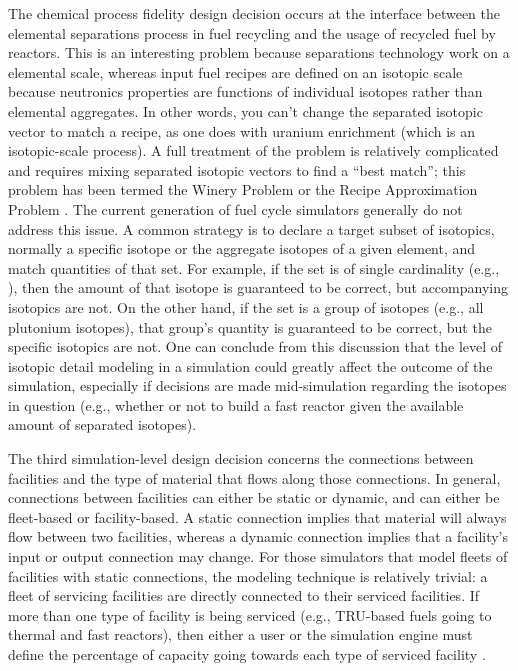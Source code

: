 The chemical process fidelity design decision occurs at the interface between
the elemental separations process in fuel recycling and the usage of recycled
fuel by reactors. This is an interesting problem because separations technology
work on a elemental scale, whereas input fuel recipes are defined on an isotopic
scale because neutronics properties are functions of individual isotopes rather
than elemental aggregates. In other words, you can't change the separated
isotopic vector to match a recipe, as one does with uranium enrichment (which is
an isotopic-scale process). A full treatment of the problem is relatively
complicated and requires mixing separated isotopic vectors to find a ``best
match''; this problem has been termed the Winery Problem or the Recipe
Approximation Problem \cite{oliver_geniusv2:_2009}. The current generation of
fuel cycle simulators generally do not address this issue. A common strategy is
to declare a target subset of isotopics, normally a specific isotope or the
aggregate isotopes of a given element, and match quantities of that set. For
example, if the set is of single cardinality (e.g., ), then the
amount of that isotope is guaranteed to be correct, but accompanying isotopics
are not. On the other hand, if the set is a group of isotopes (e.g., all
plutonium isotopes), that group's quantity is guaranteed to be correct, but the
specific isotopics are not. One can conclude from this discussion that the level
of isotopic detail modeling in a simulation could greatly affect the outcome of
the simulation, especially if decisions are made mid-simulation regarding the
isotopes in question (e.g., whether or not to build a fast reactor given the
available amount of separated isotopes). 

The third simulation-level design decision concerns the connections between
facilities and the type of material that flows along those connections. In
general, connections between facilities can either be static or dynamic, and can
either be fleet-based or facility-based. A static connection implies that
material will always flow between two facilities, whereas a dynamic connection
implies that a facility's input or output connection may change.  For those
simulators that model fleets of facilities with static connections, the modeling
technique is relatively trivial: a fleet of servicing facilities are directly
connected to their serviced facilities. If more than one type of facility is
being serviced (e.g., TRU-based fuels going to thermal and fast reactors), then
either a user or the simulation engine must define the percentage of capacity
going towards each type of serviced facility \cite{busquim_e_silva_system_2008}.

